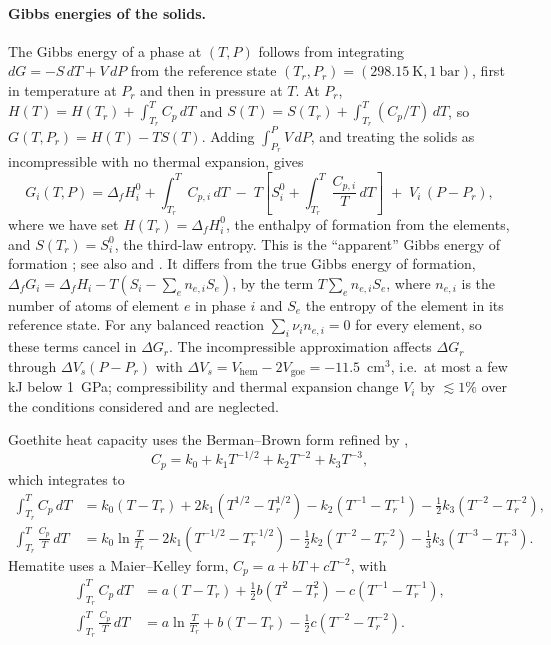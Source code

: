 \paragraph{Gibbs energies of the solids.} The Gibbs energy of a phase at $(T,P)$ follows from
integrating $dG = -S\,dT + V\,dP$ from the reference state $(T_r,P_r) = (298.15~\mathrm{K}, 1~\mathrm{bar})$,
first in temperature at $P_r$ and then in pressure at $T$. At $P_r$,
$H(T) = H(T_r) + \int_{T_r}^{T}C_p\,dT$ and $S(T) = S(T_r) + \int_{T_r}^{T}(C_p/T)\,dT$, so
$G(T,P_r) = H(T) - T S(T)$. Adding $\int_{P_r}^{P}V\,dP$, and treating the solids as incompressible
with no thermal expansion, gives
\begin{equation}
  G_i(T,P) = \Delta_f H_i^{0} + \int_{T_r}^{T} C_{p,i}\,dT
  \;-\; T\left[S_i^{0} + \int_{T_r}^{T}\frac{C_{p,i}}{T}\,dT\right]
  \;+\; V_i\,(P-P_r),
  \label{eq:gt_Gsolid}
\end{equation}
where we have set $H(T_r) = \Delta_f H_i^{0}$, the enthalpy of formation from the elements, and
$S(T_r) = S_i^{0}$, the third-law entropy. This is the ``apparent'' Gibbs energy of formation
\citep{berman1988}; see also \citet{helgeson1978} and \citet{anderson2005}. It differs from
the true Gibbs energy of formation,
$\Delta_f G_i = \Delta_f H_i - T(S_i - \sum_e n_{e,i} S_e)$, by the term $T\sum_e n_{e,i}S_e$,
where $n_{e,i}$ is the number of atoms of element $e$ in phase $i$ and $S_e$ the entropy of the
element in its reference state. For any balanced reaction $\sum_i \nu_i n_{e,i} = 0$ for every element,
so these terms cancel in $\Delta G_r$. The incompressible approximation affects $\Delta G_r$
through $\Delta V_s (P-P_r)$ with $\Delta V_s = V_{\mathrm{hem}} - 2V_{\mathrm{goe}} = -11.5$~cm$^3$,
i.e.\ at most a few kJ below 1~GPa; compressibility and thermal expansion change $V_i$ by
$\lesssim1\%$ over the conditions considered and are neglected.

Goethite heat capacity uses the Berman--Brown form \citep{berman1985} refined by
\citet{majzlan2003b},
\begin{equation}
  C_p = k_0 + k_1 T^{-1/2} + k_2 T^{-2} + k_3 T^{-3},
\end{equation}
which integrates to
\begin{align}
  \int_{T_r}^{T} C_p\,dT &= k_0 (T-T_r) + 2k_1\left(T^{1/2}-T_r^{1/2}\right)
    - k_2\left(T^{-1}-T_r^{-1}\right) - \tfrac{1}{2}k_3\left(T^{-2}-T_r^{-2}\right), \\
  \int_{T_r}^{T} \frac{C_p}{T}\,dT &= k_0 \ln\frac{T}{T_r} - 2k_1\left(T^{-1/2}-T_r^{-1/2}\right)
    - \tfrac{1}{2}k_2\left(T^{-2}-T_r^{-2}\right) - \tfrac{1}{3}k_3\left(T^{-3}-T_r^{-3}\right).
\end{align}
Hematite uses a Maier--Kelley form, $C_p = a + bT + cT^{-2}$, with
\begin{align}
  \int_{T_r}^{T} C_p\,dT &= a(T-T_r) + \tfrac{1}{2}b\left(T^2-T_r^2\right) - c\left(T^{-1}-T_r^{-1}\right), \\
  \int_{T_r}^{T} \frac{C_p}{T}\,dT &= a\ln\frac{T}{T_r} + b(T-T_r) - \tfrac{1}{2}c\left(T^{-2}-T_r^{-2}\right).
\end{align}

